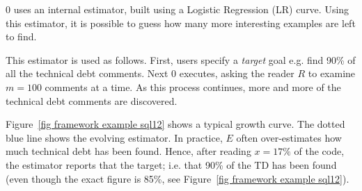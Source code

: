 \documentclass[10pt,conference]{IEEEtran}
\begin{document}


{\IT}0 uses an internal estimator, built using a Logistic Regression (LR) curve. %
Using this estimator, it is possible to   guess   how
many more interesting examples are left to find.

This estimator is used as follows. First, users specify a
{\em target} goal e.g. find 90\% of all the technical debt comments.
Next
{\IT}0  executes, asking the reader $R$ to examine $m=100$ comments at a time. As this process continues, more and more of the technical
debt comments are discovered. 

Figure~\ref{fig framework example sql12} shows a typical growth
curve. The dotted blue line shows the evolving estimator.
In practice, $E$ often over-estimates how much technical debt has been found. Hence, after reading $x=17\%$ of the code, the estimator reports that the target; i.e. that 90\% of the TD has been found (even though the exact
figure is 85\%, see Figure~\ref{fig framework example sql12}).
\end{document}

